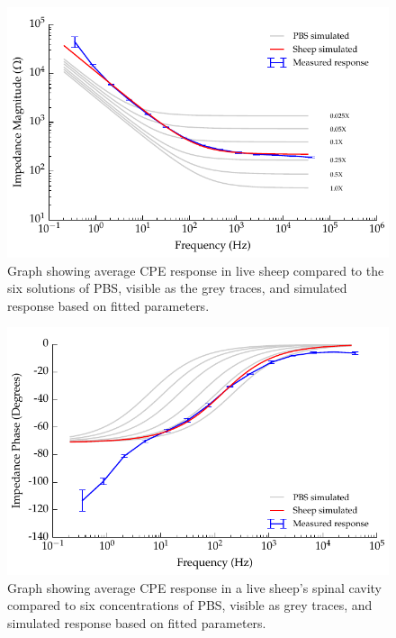   
    \begin{figure}
      \centering
      \includegraphics{content/pt2/08-InterfaceParameters/graphics/graph_displacement-withSheep_impedanceVsFrequency_magnitude_thesis}
      \caption{\label{fig:graph_displacement-withSheep_impedanceVsFrequensy_magnitude} Graph showing average CPE response in live sheep compared to the six solutions of PBS, visible as the grey traces, and simulated response based on fitted parameters.} 
    \end{figure}
    
    \begin{figure}
      \centering
      \includegraphics{content/pt2/08-InterfaceParameters/graphics/graph_displacement-withSheep_impedanceVsFrequency_phase_thesis}
      \caption{\label{fig:graph_displacement-withSheep_impedanceVsFrequency_phase} Graph showing average CPE response in a live sheep's spinal cavity compared to six concentrations of PBS, visible as grey traces, and simulated response based on fitted parameters.} 
    \end{figure}
  
